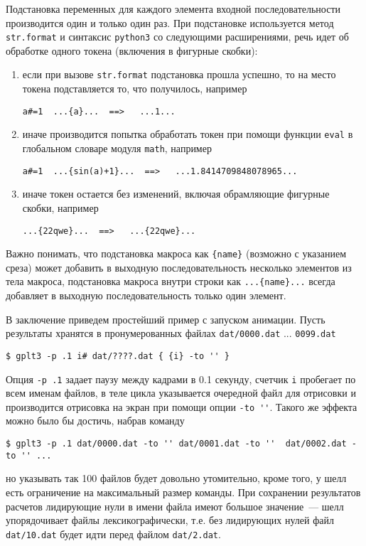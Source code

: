 \documentclass[12pt]{article}
\def\python{{\tt python3}}
\begin{document}
Подстановка переменных для каждого элемента входной последовательности производится один и только один раз.
При подстановке используется метод \verb'str.format' и синтаксис \python{} со следующими расширениями, речь идет об обработке одного токена (включения в фигурные скобки):
\begin{enumerate}
\item если при вызове \verb'str.format' подстановка прошла успешно, то на место токена подставляется то, что получилось, например
\begin{verbatim}
a#=1  ...{a}...  ==>   ...1...
\end{verbatim}
\item иначе производится попытка обработать токен при помощи функции \verb'eval' в глобальном словаре модуля \verb'math', например
\begin{verbatim}
a#=1  ...{sin(a)+1}...  ==>   ...1.8414709848078965...
\end{verbatim}  
\item иначе токен остается без изменений, включая обрамляющие фигурные скобки, например
\begin{verbatim}
...{22qwe}...  ==>   ...{22qwe}...
\end{verbatim}    
\end{enumerate}
Важно понимать, что подстановка макроса как \verb'{name}' (возможно с указанием среза) может добавить в выходную последовательность
несколько элементов из тела макроса, подстановка макроса внутри строки как \verb'...{name}...' всегда добавляет в выходную последовательность только один элемент.

В заключение приведем простейший пример с запуском анимации. Пусть результаты хранятся в пронумерованных файлах \verb'dat/0000.dat' ... \verb'0099.dat'
\begin{verbatim}
$ gplt3 -p .1 i# dat/????.dat { {i} -to '' }
\end{verbatim}
Опция \verb'-p .1' задает паузу между кадрами в 0.1 секунду, счетчик \verb'i' пробегает по всем именам файлов, в теле цикла указывается очередной файл
для отрисовки и производится отрисовка на экран при помощи опции \verb|-to ''|. Такого же эффекта можно было бы достичь, набрав команду
\begin{verbatim}
$ gplt3 -p .1 dat/0000.dat -to '' dat/0001.dat -to ''  dat/0002.dat -to '' ...
\end{verbatim}
но указывать так 100 файлов будет довольно утомительно, кроме того, у шелл есть ограничение на максимальный размер команды.
При сохранении результатов расчетов лидирующие нули в имени файла имеют большое значение~--- шелл упорядочивает файлы лексикографически, т.е. без лидирующих нулей
файл \verb'dat/10.dat' будет идти перед файлом \verb'dat/2.dat'.
\end{document}
